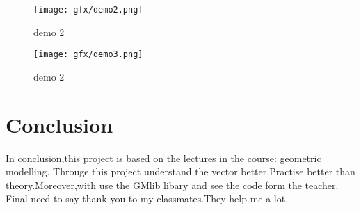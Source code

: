 \documentclass[a4,10pt]{article}
\begin{document}
    \begin{figure}[H]
      \centering
      \texttt{[image: gfx/demo2.png]}
      \caption{demo 2}
      \label{fig:fi}
    \end{figure}


    \begin{figure}[H]
      \centering
      \texttt{[image: gfx/demo3.png]}
      \caption{demo 2}
      \label{fig:fi}
    \end{figure}


  \section{Conclusion}
    In conclusion,this project is  based on the lectures in the course: geometric modelling.
Througe this project understand the vector better.Practise better than theory.Moreover,with use the 
GMlib libary and see the code form the teacher.
Final need to say thank you to my classmates.They help me a lot.
  
\end{document}
